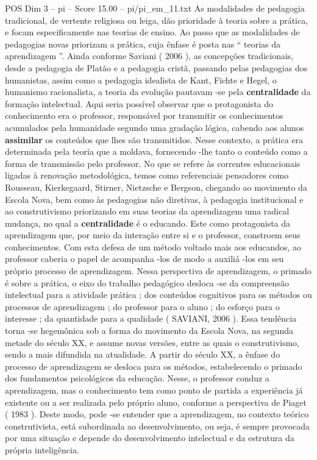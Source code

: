 \begin{textsample}{POS Dim 3 – pi – Score 15.00 – pi/pi\_em\_11.txt}
As modalidades de pedagogia tradicional, de vertente religiosa ou leiga, dão prioridade à teoria sobre a prática, e focam especificamente nas teorias de ensino.
Ao passo que as modalidades de pedagogias novas priorizam a prática, cuja ênfase é posta nas “ teorias da aprendizagem ”.
Ainda conforme Saviani ( 2006 ), as concepções tradicionais, desde a pedagogia de Platão e a pedagogia cristã, passando pelas pedagogias dos humanistas, assim como a pedagogia idealista de Kant, Fichte e Hegel, o humanismo racionalista, a teoria da evolução pautavam -se pela \textbf{centralidade} da formação intelectual.
Aqui seria possível observar que o protagonista do conhecimento era o professor, responsável por transmitir os conhecimentos acumulados pela humanidade segundo uma gradação lógica, cabendo aos alunos \textbf{assimilar} os conteúdos que lhes são transmitidos.
Nesse contexto, a prática era determinada pela teoria que a moldava, fornecendo -lhe tanto o conteúdo como a forma de transmissão pelo professor.
No que se refere às correntes educacionais ligadas à renovação metodológica, temos como referenciais pensadores como Rousseau, Kierkegaard, Stirner, Nietzsche e Bergson, chegando ao movimento da Escola Nova, bem como às pedagogias não diretivas, à pedagogia institucional e ao construtivismo priorizando em suas teorias da aprendizagem uma radical mudança, no qual a \textbf{centralidade} é o educando.
Este como protagonista da aprendizagem que, por meio da interação entre si e o professor, constroem seus conhecimentos.
Com esta defesa de um método voltado mais aos educandos, ao professor caberia o papel de acompanha -los de modo a auxiliá -los em seu próprio processo de aprendizagem.
Nessa perspectiva de aprendizagem, o primado é sobre a prática, o eixo do trabalho pedagógico desloca -se da compreensão intelectual para a atividade prática ; dos conteúdos cognitivos para os métodos ou processos de aprendizagem ; do professor para o aluno ; do esforço para o interesse ; da quantidade para a qualidade ( SAVIANI, 2006 ).
Essa tendência torna -se hegemônica sob a forma do movimento da Escola Nova, na segunda metade do século XX, e assume novas versões, entre as quais o construtivismo, sendo a mais difundida na atualidade.
A partir do século XX, a ênfase do processo de aprendizagem se desloca para os métodos, estabelecendo o primado dos fundamentos psicológicos da educação.
Nesse, o professor conduz a aprendizagem, mas o conhecimento tem como ponto de partida a experiência já existente ou a ser realizada pelo próprio aluno, conforme a perspectiva de Piaget ( 1983 ).
Deste modo, pode -se entender que a aprendizagem, no contexto teórico construtivista, está subordinada ao desenvolvimento, ou seja, é sempre provocada por uma situação e depende do desenvolvimento intelectual e da estrutura da própria inteligência.

\end{textsample}
